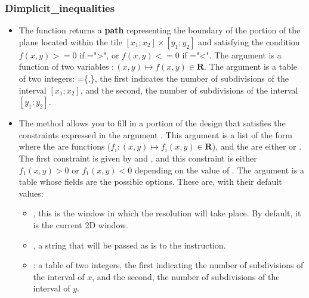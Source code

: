 \subsubsection{Dimplicit\_inequalities}

\begin{itemize}
    \item The function  returns a \textbf{path} representing the boundary of the portion of the plane located within the tile $[x_1;x_2]\times[y_1;y_2]$ and satisfying the condition $f(x,y)>=0$ if =">", or $f(x,y)<=0$ if ="<". The argument  is a function of two variables $\colon (x,y)\mapsto f(x,y)\in \mathbf R$. The argument  is a table of two integers: =\{,\}, the first indicates the number of subdivisions of the interval $[x_1;x_2]$, and the second, the number of subdivisions of the interval $[y_1;y_2]$.
    
    \item The method  allows you to fill in a portion of the design that satisfies the constraints expressed in the argument . This argument is a list of the form  where the  are functions ($f_i\colon (x,y) \mapsto f_i(x,y)\in \mathbf R$), and the  are either  or . The first constraint is given by  and , and this constraint is either $f_1(x,y)>0$ or $f_1(x,y)<0$ depending on the value of . The argument  is a table whose fields are the possible options. These are, with their default values:

        \begin{itemize}
        \item {}, this is the window in which the resolution will take place. By default, it is the current 2D window.

        \item {}, a string that will be passed as is to the \drawcmd instruction.

        \item {}: a table of two integers, the first indicating the number of subdivisions of the interval of $x$, and the second, the number of subdivisions of the interval of $y$.
    \end{itemize}
\end{itemize}

